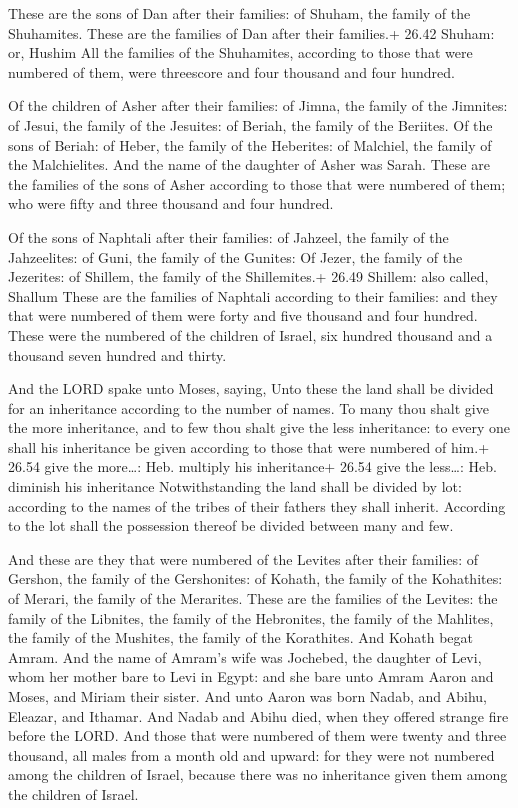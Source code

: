  These are the sons of Dan after their families: of
Shuham, the family of the Shuhamites. These are the families of Dan
after their families.+ 26.42 Shuham: or, Hushim  All the
families of the Shuhamites, according to those that were numbered of
them, were threescore and four thousand and four hundred.

 Of the children of Asher after their families: of Jimna,
the family of the Jimnites: of Jesui, the family of the Jesuites: of
Beriah, the family of the Beriites.  Of the sons of Beriah:
of Heber, the family of the Heberites: of Malchiel, the family of the
Malchielites.  And the name of the daughter of Asher was
Sarah.  These are the families of the sons of Asher
according to those that were numbered of them; who were fifty and three
thousand and four hundred.

 Of the sons of Naphtali after their families: of
Jahzeel, the family of the Jahzeelites: of Guni, the family of the
Gunites:  Of Jezer, the family of the Jezerites: of
Shillem, the family of the Shillemites.+ 26.49 Shillem: also called,
Shallum  These are the families of Naphtali according to
their families: and they that were numbered of them were forty and five
thousand and four hundred.  These were the numbered of the
children of Israel, six hundred thousand and a thousand seven hundred
and thirty.

 And the LORD spake unto Moses, saying, 
Unto these the land shall be divided for an inheritance according to the
number of names.  To many thou shalt give the more
inheritance, and to few thou shalt give the less inheritance: to every
one shall his inheritance be given according to those that were numbered
of him.+ 26.54 give the more\ldots: Heb. multiply his inheritance+ 26.54
give the less\ldots: Heb. diminish his inheritance 
Notwithstanding the land shall be divided by lot: according to the names
of the tribes of their fathers they shall inherit. 
According to the lot shall the possession thereof be divided between
many and few.

 And these are they that were numbered of the Levites
after their families: of Gershon, the family of the Gershonites: of
Kohath, the family of the Kohathites: of Merari, the family of the
Merarites.  These are the families of the Levites: the
family of the Libnites, the family of the Hebronites, the family of the
Mahlites, the family of the Mushites, the family of the Korathites. And
Kohath begat Amram.  And the name of Amram's wife was
Jochebed, the daughter of Levi, whom her mother bare to Levi in Egypt:
and she bare unto Amram Aaron and Moses, and Miriam their sister.
 And unto Aaron was born Nadab, and Abihu, Eleazar, and
Ithamar.  And Nadab and Abihu died, when they offered
strange fire before the LORD.  And those that were numbered
of them were twenty and three thousand, all males from a month old and
upward: for they were not numbered among the children of Israel, because
there was no inheritance given them among the children of Israel.

